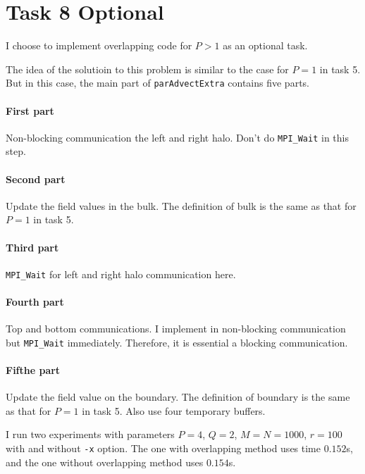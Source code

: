 \section{Task 8 Optional}

I choose to implement overlapping code for $P>1$ as an optional task.

\vspace{\baselineskip}

The idea of the solutioin to this problem is similar to the case for $P=1$ in task 5.
But in this case, the main part of \lstinline{parAdvectExtra} contains five parts. 
\paragraph{First part} Non-blocking communication the left and right halo. Don't do \lstinline{MPI_Wait} in this step.
\paragraph{Second part} Update the field values in the bulk. The definition of bulk is the same as that for $P=1$ in task 5.
\paragraph{Third part} \lstinline{MPI_Wait} for left and right halo communication here.
\paragraph{Fourth part} Top and bottom communications. I implement in non-blocking communication but \lstinline{MPI_Wait} immediately. Therefore, it is essential a blocking communication.
\paragraph{Fifthe part} Update the field value on the boundary. The definition of boundary is the same as that for $P=1$ in task 5. Also use four temporary buffers.

\vspace{\baselineskip}

I run two experiments with parameters $P=4$, $Q=2$, $M=N=1000$, $r=100$ with and without \lstinline{-x} option. 
The one with overlapping method uses time $0.152$s, and the one without overlapping method uses $0.154$s.
